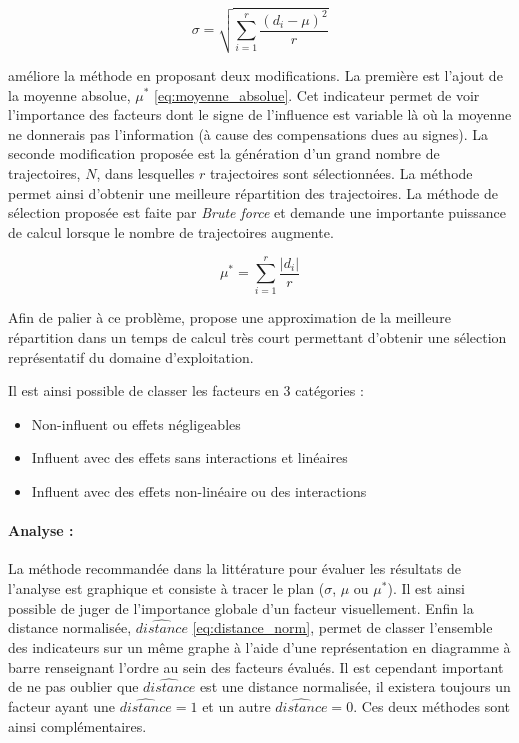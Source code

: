 \begin{equation}\label{eq:ecart_type}
    \sigma = \sqrt{\sum_{i=1}^{r}\frac{(d_{i} - \mu)^{2}}{r}}
\end{equation}

\cite{Campolongo20071509} améliore la méthode en proposant deux modifications. La première
est l’ajout de la moyenne absolue, $\mu^{*}$ \eqref{eq:moyenne_absolue}. Cet indicateur permet
de voir l’importance des facteurs dont le signe de l’influence est variable là où
la moyenne ne donnerais pas l’information (à cause des compensations dues au signes).
La seconde modification proposée est la génération d’un grand nombre de trajectoires, $N$,
dans lesquelles $r$ trajectoires sont sélectionnées. La méthode permet ainsi
d’obtenir une meilleure répartition des trajectoires.
La méthode de sélection proposée est faite par \emph{Brute force} et demande une
importante puissance de calcul lorsque le nombre de trajectoires augmente.

\begin{equation}\label{eq:moyenne_absolue}
    \mu^{*} = \sum_{i = 1}^{r} \frac{\lvert d_{i} \rvert}{r}
\end{equation}

Afin de palier à ce problème, \cite{Ruano2012103} propose une approximation de
la meilleure répartition dans un temps de calcul très court permettant d’obtenir
une sélection représentatif du domaine d’exploitation.

Il est ainsi possible de classer les facteurs en 3 catégories :
\begin{itemize}
  \item Non-influent ou effets négligeables
  \item Influent avec des effets sans interactions et linéaires
  \item Influent avec des effets non-linéaire ou des interactions
\end{itemize}

\paragraph{Analyse :} %
\label{par:analyse}
La méthode recommandée dans la littérature pour évaluer les résultats de l’analyse
est graphique et consiste à tracer le plan ($\sigma$, $\mu$ ou $\mu^{*}$). Il est
ainsi possible de juger de l’importance globale d’un facteur visuellement.
Enfin la distance normalisée, $\hat{distance}$ \eqref{eq:distance_norm}, permet
de classer l’ensemble des indicateurs sur un même graphe à l’aide d’une représentation
en diagramme à barre renseignant l’ordre au sein des facteurs évalués.
Il est cependant important de ne pas oublier que $\hat{distance}$ est une distance
normalisée, il existera toujours un facteur ayant une $\hat{distance} = 1$ et un autre
$\hat{distance} = 0$. Ces deux méthodes sont ainsi complémentaires.

